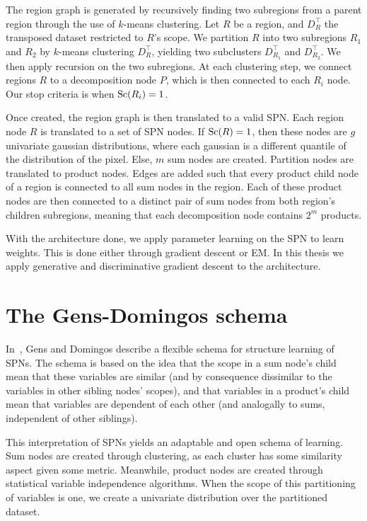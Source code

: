 The region graph is generated by recursively finding two subregions from a parent region through
the use of $k$-means clustering. Let $R$ be a region, and $D_R^\intercal$ the transposed dataset
restricted to $R$'s scope. We partition $R$ into two subregions $R_1$ and $R_2$ by $k$-means
clustering $D_R^\intercal$, yielding two subclusters $D_{R_1}^\intercal$ and $D_{R_2}^\intercal$.
We then apply recursion on the two subregions. At each clustering step, we connect regions $R$ to a
decomposition node $P$, which is then connected to each $R_i$ node. Our stop criteria is when
$\operatorname*{\text{Sc}}(R_i)=1$.

Once created, the region graph is then translated to a valid SPN\@. Each region node $R$ is
translated to a set of SPN nodes. If $\operatorname*{\text{Sc}}(R)=1$, then these nodes are $g$ univariate gaussian
distributions, where each gaussian is a different quantile of the distribution of the pixel. Else,
$m$ sum nodes are created. Partition nodes are translated to product nodes. Edges are added such
that every product child node of a region is connected to all sum nodes in the region. Each of
these product nodes are then connected to a distinct pair of sum nodes from both region's children
subregions, meaning that each decomposition node contains $2^m$ products.

With the architecture done, we apply parameter learning on the SPN to learn weights. This is done
either through gradient descent or EM\@. In this thesis we apply generative and discriminative
gradient descent to the architecture.

\section{The Gens-Domingos schema}

In~\cite{gens-domingos}, Gens and Domingos describe a flexible schema for structure learning of
SPNs. The schema is based on the idea that the scope in a sum node's child mean that these
variables are similar (and by consequence dissimilar to the variables in other sibling nodes'
scopes), and that variables in a product's child mean that variables are dependent of each other
(and analogally to sums, independent of other siblings).

This interpretation of SPNs yields an adaptable and open schema of learning. Sum nodes are created
through clustering, as each cluster has some similarity aspect given some metric. Meanwhile,
product nodes are created through statistical variable independence algorithms. When the scope of
this partitioning of variables is one, we create a univariate distribution over the partitioned
dataset.

